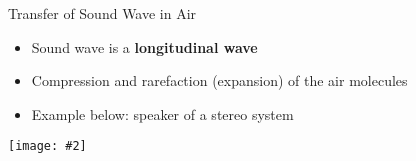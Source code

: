\documentclass[12pt,compress,aspectratio=169]{beamer}
\newcommand{\pic}[2]{\texttt{[image: \#2]}}
\begin{document}
%
%
%
%
%
%



\begin{frame}{Transfer of Sound Wave in Air}
  \begin{itemize}
  \item Sound wave is a \textbf{longitudinal wave}
  \item Compression and rarefaction (expansion) of the air molecules
  \item Example below: speaker of a stereo system
  \end{itemize}
  \begin{center}
    \pic{.8}{speaker.png}
  \end{center}
\end{frame}
\end{document}
